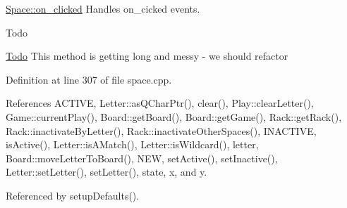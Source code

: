 \hyperlink{class_space_a762303973d71621706a7a8195bd0f946}{Space\-::on\-\_\-clicked} Handles on\-\_\-cicked events. 

\begin{DoxyRefDesc}{Todo}
\item[\hyperlink{todo__todo000004}{Todo}]This method is getting long and messy -\/ we should refactor \end{DoxyRefDesc}


Definition at line 307 of file space.\-cpp.



References A\-C\-T\-I\-V\-E, Letter\-::as\-Q\-Char\-Ptr(), clear(), Play\-::clear\-Letter(), Game\-::current\-Play(), Board\-::get\-Board(), Board\-::get\-Game(), Rack\-::get\-Rack(), Rack\-::inactivate\-By\-Letter(), Rack\-::inactivate\-Other\-Spaces(), I\-N\-A\-C\-T\-I\-V\-E, is\-Active(), Letter\-::is\-A\-Match(), Letter\-::is\-Wildcard(), letter, Board\-::move\-Letter\-To\-Board(), N\-E\-W, set\-Active(), set\-Inactive(), Letter\-::set\-Letter(), set\-Letter(), state, x, and y.



Referenced by setup\-Defaults().


